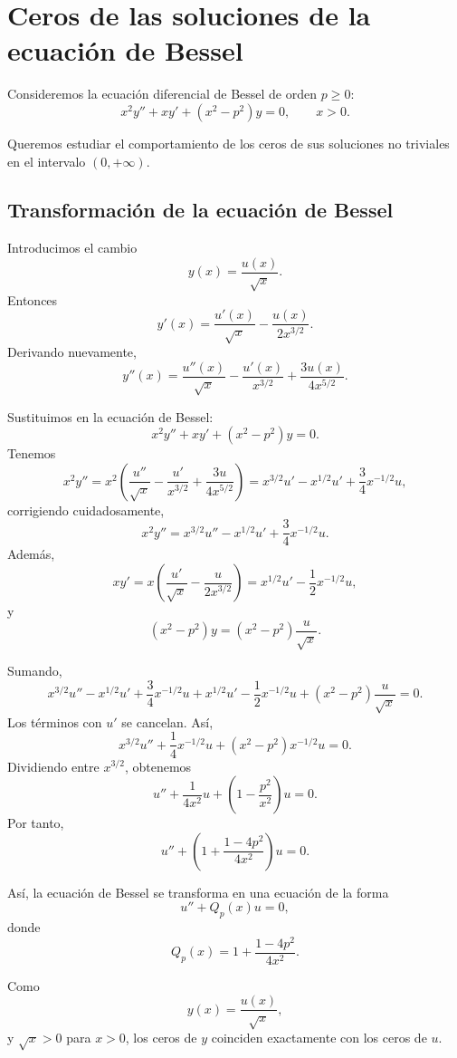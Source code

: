 \documentclass[12pt,a4paper]{article}
\theoremstyle{definition}
\begin{document}
\section{Ceros de las soluciones de la ecuación de Bessel}

Consideremos la ecuación diferencial de Bessel de orden \(p\geq 0\):
\begin{equation}\label{eq:bessel}
x^2y''+xy'+(x^2-p^2)y=0,
\qquad x>0.
\end{equation}

Queremos estudiar el comportamiento de los ceros de sus soluciones no triviales en el intervalo \((0,+\infty)\).

\subsection{Transformación de la ecuación de Bessel}

Introducimos el cambio
\[
y(x)=\frac{u(x)}{\sqrt{x}}.
\]
Entonces
\[
y'(x)=\frac{u'(x)}{\sqrt{x}}-\frac{u(x)}{2x^{3/2}}.
\]
Derivando nuevamente,
\[
y''(x)
=
\frac{u''(x)}{\sqrt{x}}
-\frac{u'(x)}{x^{3/2}}
+\frac{3u(x)}{4x^{5/2}}.
\]

Sustituimos en la ecuación de Bessel:
\[
x^2y''+xy'+(x^2-p^2)y=0.
\]
Tenemos
\[
x^2y''
=
x^2\left(
\frac{u''}{\sqrt{x}}
-\frac{u'}{x^{3/2}}
+\frac{3u}{4x^{5/2}}
\right)
=
x^{3/2}u'-x^{1/2}u'
+\frac{3}{4}x^{-1/2}u,
\]
corrigiendo cuidadosamente,
\[
x^2y''
=
x^{3/2}u''
-x^{1/2}u'
+\frac{3}{4}x^{-1/2}u.
\]
Además,
\[
xy'
=
x\left(
\frac{u'}{\sqrt{x}}-\frac{u}{2x^{3/2}}
\right)
=
x^{1/2}u'-\frac{1}{2}x^{-1/2}u,
\]
y
\[
(x^2-p^2)y
=
(x^2-p^2)\frac{u}{\sqrt{x}}.
\]

Sumando,
\[
x^{3/2}u''
-x^{1/2}u'
+\frac{3}{4}x^{-1/2}u
+
x^{1/2}u'
-\frac{1}{2}x^{-1/2}u
+
(x^2-p^2)\frac{u}{\sqrt{x}}
=0.
\]
Los términos con \(u'\) se cancelan. Así,
\[
x^{3/2}u''
+
\frac{1}{4}x^{-1/2}u
+
(x^2-p^2)x^{-1/2}u=0.
\]
Dividiendo entre \(x^{3/2}\), obtenemos
\[
u''
+
\frac{1}{4x^2}u
+
\left(1-\frac{p^2}{x^2}\right)u
=0.
\]
Por tanto,
\begin{equation}\label{eq:bessel-transformada}
u''+
\left(
1+\frac{1-4p^2}{4x^2}
\right)u=0.
\end{equation}

Así, la ecuación de Bessel se transforma en una ecuación de la forma
\[
u''+Q_p(x)u=0,
\]
donde
\[
Q_p(x)=1+\frac{1-4p^2}{4x^2}.
\]

Como
\[
y(x)=\frac{u(x)}{\sqrt{x}},
\]
y \(\sqrt{x}>0\) para \(x>0\), los ceros de \(y\) coinciden exactamente con los ceros de \(u\).
\end{document}
